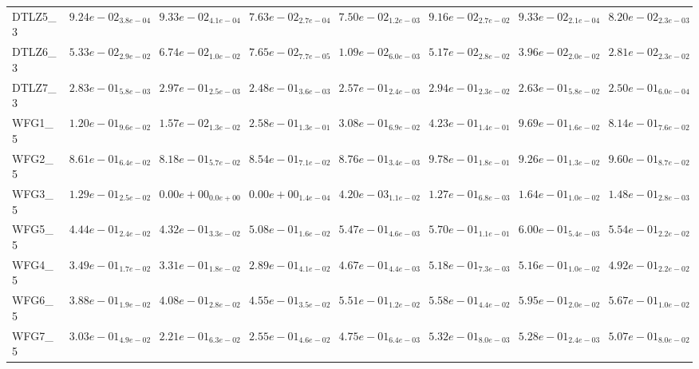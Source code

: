 \documentclass{article}
\begin{document}
\begin{landscape}
\begin{table}
\begin{scriptsize}
\begin{tabular}{llllllll}
DTLZ5\_3 & $  9.24e-02_{ 3.8e-04}$ & \cellcolor{gray25}$  9.33e-02_{ 4.1e-04}$ & $  7.63e-02_{ 2.7e-04}$ & $  7.50e-02_{ 1.2e-03}$ & $  9.16e-02_{ 2.7e-02}$ & \cellcolor{gray95}$  9.33e-02_{ 2.1e-04}$ & $  8.20e-02_{ 2.3e-03}$ \\
DTLZ6\_3 & $  5.33e-02_{ 2.9e-02}$ & \cellcolor{gray25}$  6.74e-02_{ 1.0e-02}$ & \cellcolor{gray95}$  7.65e-02_{ 7.7e-05}$ & $  1.09e-02_{ 6.0e-03}$ & $  5.17e-02_{ 2.8e-02}$ & $  3.96e-02_{ 2.0e-02}$ & $  2.81e-02_{ 2.3e-02}$ \\
DTLZ7\_3 & $  2.83e-01_{ 5.8e-03}$ & \cellcolor{gray95}$  2.97e-01_{ 2.5e-03}$ & $  2.48e-01_{ 3.6e-03}$ & $  2.57e-01_{ 2.4e-03}$ & \cellcolor{gray25}$  2.94e-01_{ 2.3e-02}$ & $  2.63e-01_{ 5.8e-02}$ & $  2.50e-01_{ 6.0e-04}$ \\
WFG1\_5 & $  1.20e-01_{ 9.6e-02}$ & $  1.57e-02_{ 1.3e-02}$ & $  2.58e-01_{ 1.3e-01}$ & $  3.08e-01_{ 6.9e-02}$ & $  4.23e-01_{ 1.4e-01}$ & \cellcolor{gray95}$  9.69e-01_{ 1.6e-02}$ & \cellcolor{gray25}$  8.14e-01_{ 7.6e-02}$ \\
WFG2\_5 & $  8.61e-01_{ 6.4e-02}$ & $  8.18e-01_{ 5.7e-02}$ & $  8.54e-01_{ 7.1e-02}$ & $  8.76e-01_{ 3.4e-03}$ & \cellcolor{gray95}$  9.78e-01_{ 1.8e-01}$ & $  9.26e-01_{ 1.3e-02}$ & \cellcolor{gray25}$  9.60e-01_{ 8.7e-02}$ \\
WFG3\_5 & $  1.29e-01_{ 2.5e-02}$ & $  0.00e+00_{ 0.0e+00}$ & $  0.00e+00_{ 1.4e-04}$ & $  4.20e-03_{ 1.1e-02}$ & $  1.27e-01_{ 6.8e-03}$ & \cellcolor{gray95}$  1.64e-01_{ 1.0e-02}$ & \cellcolor{gray25}$  1.48e-01_{ 2.8e-03}$ \\
WFG5\_5 & $  4.44e-01_{ 2.4e-02}$ & $  4.32e-01_{ 3.3e-02}$ & $  5.08e-01_{ 1.6e-02}$ & $  5.47e-01_{ 4.6e-03}$ & \cellcolor{gray25}$  5.70e-01_{ 1.1e-01}$ & \cellcolor{gray95}$  6.00e-01_{ 5.4e-03}$ & $  5.54e-01_{ 2.2e-02}$ \\
WFG4\_5 & $  3.49e-01_{ 1.7e-02}$ & $  3.31e-01_{ 1.8e-02}$ & $  2.89e-01_{ 4.1e-02}$ & $  4.67e-01_{ 4.4e-03}$ & \cellcolor{gray95}$  5.18e-01_{ 7.3e-03}$ & \cellcolor{gray25}$  5.16e-01_{ 1.0e-02}$ & $  4.92e-01_{ 2.2e-02}$ \\
WFG6\_5 & $  3.88e-01_{ 1.9e-02}$ & $  4.08e-01_{ 2.8e-02}$ & $  4.55e-01_{ 3.5e-02}$ & $  5.51e-01_{ 1.2e-02}$ & $  5.58e-01_{ 4.4e-02}$ & \cellcolor{gray95}$  5.95e-01_{ 2.0e-02}$ & \cellcolor{gray25}$  5.67e-01_{ 1.0e-02}$ \\
WFG7\_5 & $  3.03e-01_{ 4.9e-02}$ & $  2.21e-01_{ 6.3e-02}$ & $  2.55e-01_{ 4.6e-02}$ & $  4.75e-01_{ 6.4e-03}$ & \cellcolor{gray95}$  5.32e-01_{ 8.0e-03}$ & \cellcolor{gray25}$  5.28e-01_{ 2.4e-03}$ & $  5.07e-01_{ 8.0e-02}$ \\

\end{tabular}
\end{scriptsize}
\end{table}
\end{landscape}
\end{document}
